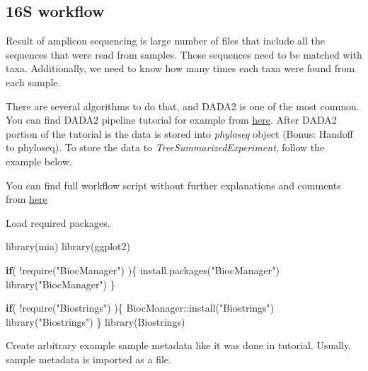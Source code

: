 \documentclass[
]{book}
\newenvironment{Shaded}{\begin{snugshade}}{\end{snugshade}}
\newcommand{\ControlFlowTok}[1]{\textcolor[rgb]{0.13,0.29,0.53}{\textbf{#1}}}
\newcommand{\FunctionTok}[1]{\textcolor[rgb]{0.00,0.00,0.00}{#1}}
\newcommand{\NormalTok}[1]{#1}
\newcommand{\SpecialCharTok}[1]{\textcolor[rgb]{0.00,0.00,0.00}{#1}}
\newcommand{\StringTok}[1]{\textcolor[rgb]{0.31,0.60,0.02}{#1}}
\begin{document}
\hypertarget{s-workflow}{%
\subsection{16S workflow}\label{s-workflow}}

Result of amplicon sequencing is large number of files that include all the sequences
that were read from samples. Those sequences need to be matched with taxa. Additionally,
we need to know how many times each taxa were found from each sample.

There are several algorithms to do that, and DADA2 is one of the most common.
You can find DADA2 pipeline tutorial for example from
\href{https://benjjneb.github.io/dada2/tutorial.html}{here}.
After DADA2 portion of the tutorial is the data is stored into \emph{phyloseq} object
(Bonus: Handoff to phyloseq). To store the data to \emph{TreeSummarizedExperiment},
follow the example below.

You can find full workflow script without further explanations and comments from
\href{https://github.com/microbiome/OMA/blob/master/dada2_workflow.Rmd}{here}

Load required packages.

\begin{Shaded}
\begin{Highlighting}[]
\FunctionTok{library}\NormalTok{(mia)}
\FunctionTok{library}\NormalTok{(ggplot2)}

\ControlFlowTok{if}\NormalTok{( }\SpecialCharTok{!}\FunctionTok{require}\NormalTok{(}\StringTok{"BiocManager"}\NormalTok{) )\{}
    \FunctionTok{install.packages}\NormalTok{(}\StringTok{"BiocManager"}\NormalTok{)}
    \FunctionTok{library}\NormalTok{(}\StringTok{"BiocManager"}\NormalTok{)}
\NormalTok{\}}

\ControlFlowTok{if}\NormalTok{( }\SpecialCharTok{!}\FunctionTok{require}\NormalTok{(}\StringTok{"Biostrings"}\NormalTok{) )\{}
\NormalTok{    BiocManager}\SpecialCharTok{::}\FunctionTok{install}\NormalTok{(}\StringTok{"Biostrings"}\NormalTok{)}
    \FunctionTok{library}\NormalTok{(}\StringTok{"Biostrings"}\NormalTok{)}
\NormalTok{\}}
\FunctionTok{library}\NormalTok{(Biostrings)}
\end{Highlighting}
\end{Shaded}

Create arbitrary example sample metadata like it was done in tutorial. Usually,
sample metadata is imported as a file.
\end{document}
